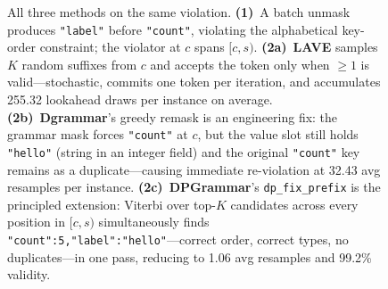 \begin{figure}[t]
\caption{\label{fig:dp-validity-boost}%
  All three methods on the same violation.
  \textbf{(1)}~A batch unmask produces \texttt{"label"} before \texttt{"count"},
  violating the alphabetical key-order constraint; the violator at $c$ spans $[c,s)$.
  \textbf{(2a)}~\textbf{LAVE} samples $K$ random suffixes from $c$ and accepts the
  token only when $\geq\!1$ is valid—stochastic, commits one token per iteration,
  and accumulates 255.32 lookahead draws per instance on average.
  \textbf{(2b)}~\textbf{Dgrammar}'s greedy remask is an engineering fix: the grammar
  mask forces \texttt{"count"} at $c$, but the value slot still holds \texttt{"hello"}
  (string in an integer field) and the original \texttt{"count"} key remains as a
  duplicate—causing immediate re-violation at 32.43 avg resamples per instance.
  \textbf{(2c)}~\textbf{DPGrammar}'s \texttt{dp\_fix\_prefix} is the principled
  extension: Viterbi over top-$K$ candidates across every position in $[c,s)$
  simultaneously finds \texttt{"count":5,"label":"hello"}—correct order, correct
  types, no duplicates—in one pass, reducing to 1.06 avg resamples and 99.2\% validity.}
\end{figure}